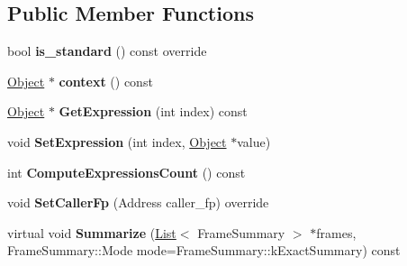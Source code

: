 \subsection*{Public Member Functions}
\begin{DoxyCompactItemize}
\item 
bool {\bfseries is\+\_\+standard} () const  override\hypertarget{classv8_1_1internal_1_1_standard_frame_a7dcdc21afb6050f1793e98666018cebd}{}\label{classv8_1_1internal_1_1_standard_frame_a7dcdc21afb6050f1793e98666018cebd}

\item 
\hyperlink{classv8_1_1internal_1_1_object}{Object} $\ast$ {\bfseries context} () const \hypertarget{classv8_1_1internal_1_1_standard_frame_a655d97d869e1d0d2b8750c7b1d901309}{}\label{classv8_1_1internal_1_1_standard_frame_a655d97d869e1d0d2b8750c7b1d901309}

\item 
\hyperlink{classv8_1_1internal_1_1_object}{Object} $\ast$ {\bfseries Get\+Expression} (int index) const \hypertarget{classv8_1_1internal_1_1_standard_frame_aa15b141e767fbcbe4597c9b1c5cfd6d9}{}\label{classv8_1_1internal_1_1_standard_frame_aa15b141e767fbcbe4597c9b1c5cfd6d9}

\item 
void {\bfseries Set\+Expression} (int index, \hyperlink{classv8_1_1internal_1_1_object}{Object} $\ast$value)\hypertarget{classv8_1_1internal_1_1_standard_frame_af54efba3be436dc1db0e7303cdb61af5}{}\label{classv8_1_1internal_1_1_standard_frame_af54efba3be436dc1db0e7303cdb61af5}

\item 
int {\bfseries Compute\+Expressions\+Count} () const \hypertarget{classv8_1_1internal_1_1_standard_frame_a2e1ee00157cacd0225c22d596c02b34d}{}\label{classv8_1_1internal_1_1_standard_frame_a2e1ee00157cacd0225c22d596c02b34d}

\item 
void {\bfseries Set\+Caller\+Fp} (Address caller\+\_\+fp) override\hypertarget{classv8_1_1internal_1_1_standard_frame_a27cd3a29292721e6865b0ec36a95e3f4}{}\label{classv8_1_1internal_1_1_standard_frame_a27cd3a29292721e6865b0ec36a95e3f4}

\item 
virtual void {\bfseries Summarize} (\hyperlink{classv8_1_1internal_1_1_list}{List}$<$ Frame\+Summary $>$ $\ast$frames, Frame\+Summary\+::\+Mode mode=Frame\+Summary\+::k\+Exact\+Summary) const \hypertarget{classv8_1_1internal_1_1_standard_frame_a00f3930995e2bd569f8ac547dedc50e7}{}\label{classv8_1_1internal_1_1_standard_frame_a00f3930995e2bd569f8ac547dedc50e7}


\end{DoxyCompactItemize}
